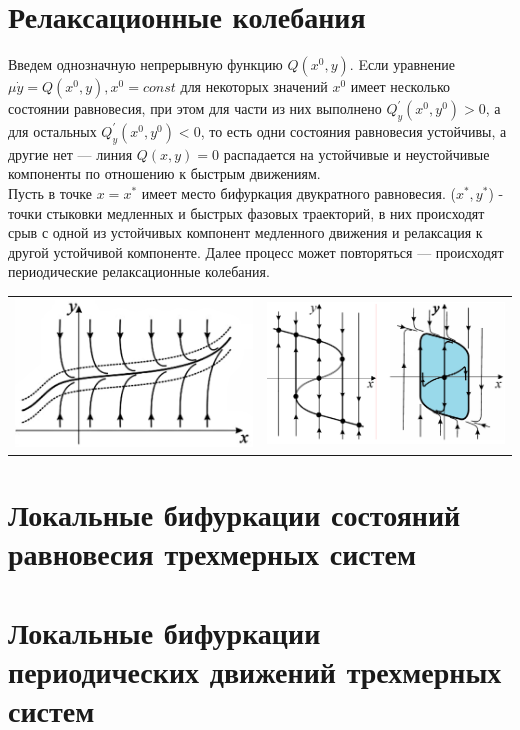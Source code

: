 \begin{multicols*}{2}
		\section{Релаксационные колебания}
		Введем однозначную непрерывную функцию $Q(x^0, y)$. Eсли уравнение $\mu \dot{y} = Q(x^0, y), x^0 = const$ для некоторых значений $x^0$ имеет несколько состоянии равновесия, при этом для части из них выполнено $Q_y^\prime(x^0, y^0) > 0$, а для остальных $Q_y^\prime(x^0, y^0) < 0$, то есть одни состояния равновесия устойчивы, а другие нет — линия $Q(x, y) = 0$ распадается на устойчивые и неустойчивые компоненты по отношению к быстрым движениям.\\
		Пусть в точке $x = x^*$ имеет место бифуркация двукратного равновесия. ($x^*, y^*$) - точки стыковки медленных и быстрых фазовых траекторий, в них происходят срыв с одной из устойчивых компонент медленного движения и релаксация к другой устойчивой компоненте. Далее процесс может повторяться — происходят периодические релаксационные колебания.\\
		\begin{tabular}{c | c}
			{\includegraphics[width=0.45\linewidth]{tk_img/sbmd_2.png}} & {\includegraphics[width=0.45\linewidth]{tk_img/sbmd.png}}
		\end{tabular}
		
		\section{Локальные бифуркации состояний равновесия трехмерных систем}
		
		\section{Локальные бифуркации периодических движений трехмерных систем}
		
	\end{multicols*}

